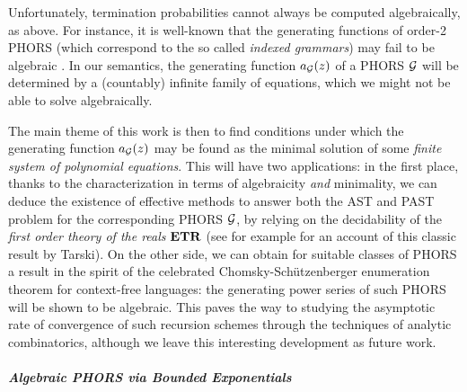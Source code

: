 Unfortunately, termination probabilities cannot always be computed algebraically, as above.
For instance, it is well-known that the generating functions of order-2 PHORS (which correspond to the so called \emph{indexed grammars}) may fail to be algebraic \cite{DBLP:journals/ita/AdamsFM13}. 
In our semantics, the generating function $a_{\mathcal{G}}(z)$ of a PHORS $\mathcal{G}$ will be determined by a (countably) infinite family of equations, which we might not be able to solve algebraically. 
 
The main theme of this work is then to find conditions under which the generating function $a_{\mathcal{G}}(z)$ may be found as the minimal solution of some \emph{finite system of polynomial equations}. This will have two applications: in the first place, thanks to the characterization in terms of algebraicity \textit{and} minimality, we can deduce the existence of effective methods to answer both the AST and PAST problem for the corresponding PHORS $\mathcal{G}$, by relying on the decidability of the \emph{first order theory of the reals} $\mathbf{ETR}$ (see for example \cite{Marker2002-jm} for an account of this classic result by Tarski). On the other side, we can obtain for suitable classes of PHORS a result in the spirit of the celebrated Chomsky-Sch\"utzenberger enumeration theorem for context-free languages: the generating power series of such PHORS will be shown to be algebraic. This paves the way to studying the asymptotic rate of convergence of such recursion schemes through the techniques of analytic combinatorics, although we leave this interesting development as future work.%


\subparagraph*{Algebraic PHORS via Bounded Exponentials}


